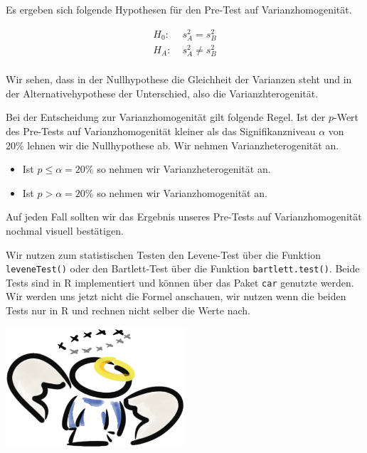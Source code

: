 \documentclass[
  letterpaper,
]{scrbook}
\providecommand{\tightlist}{%
  \setlength{\itemsep}{0pt}\setlength{\parskip}{0pt}}\usepackage{longtable,booktabs,array}
\begin{document}
Es ergeben sich folgende Hypothesen für den Pre-Test auf
Varianzhomogenität.

\[
\begin{align*}
H_0: &\; s^2_A = s^2_B\\
H_A: &\; s^2_A \ne s^2_B\\
\end{align*}
\]

Wir sehen, dass in der Nullhypothese die Gleichheit der Varianzen steht
und in der Alternativehypothese der Unterschied, also die
Varianzhterogenität.

\begin{tcolorbox}[enhanced jigsaw, coltitle=black, titlerule=0mm, bottomrule=.15mm, opacityback=0, opacitybacktitle=0.6, leftrule=.75mm, title=\textcolor{quarto-callout-important-color}{\faExclamation}\hspace{0.5em}{Entscheidung zur Varianzhomogenität}, toprule=.15mm, bottomtitle=1mm, toptitle=1mm, left=2mm, breakable, arc=.35mm, colback=white, rightrule=.15mm, colbacktitle=quarto-callout-important-color!10!white, colframe=quarto-callout-important-color-frame]
Bei der Entscheidung zur Varianzhomogenität gilt folgende Regel. Ist der
\(p\)-Wert des Pre-Tests auf Varianzhomogenität kleiner als das
Signifikanzniveau \(\alpha\) von 20\% lehnen wir die Nullhypothese ab.
Wir nehmen Varianzheterogenität an.

\begin{itemize}
\tightlist
\item
  Ist \(p \leq \alpha = 20\%\) so nehmen wir Varianzheterogenität an.
\item
  Ist \(p > \alpha = 20\%\) so nehmen wir Varianzhomogenität an.
\end{itemize}

Auf jeden Fall sollten wir das Ergebnis unseres Pre-Tests auf
Varianzhomogenität nochmal visuell bestätigen.
\end{tcolorbox}

Wir nutzen zum statistischen Testen den Levene-Test über die Funktion
\texttt{leveneTest()} oder den Bartlett-Test über die Funktion
\texttt{bartlett.test()}. Beide Tests sind in R implementiert und können
über das Paket \texttt{car} genutzte werden. Wir werden uns jetzt nicht
die Formel anschauen, wir nutzen wenn die beiden Tests nur in R und
rechnen nicht selber die Werte nach.

\begin{marginfigure}

{\centering \includegraphics[width=0.5\textwidth,height=\textheight]{./images/angel_01.png}

}

\end{marginfigure}
\end{document}
